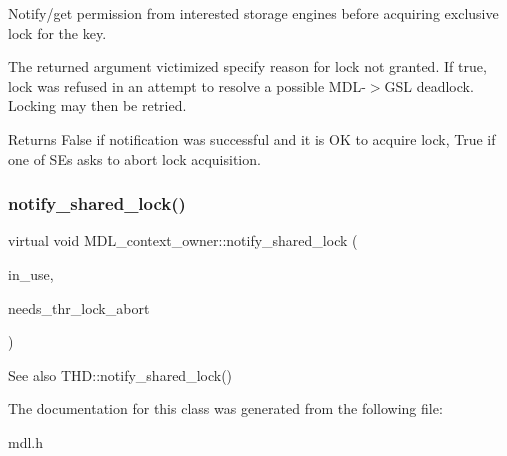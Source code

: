 Notify/get permission from interested storage engines before acquiring exclusive lock for the key.

The returned argument \textquotesingle{}victimized\textquotesingle{} specify reason for lock not granted. If \textquotesingle{}true\textquotesingle{}, lock was refused in an attempt to resolve a possible M\+DL-\/$>$G\+SL deadlock. Locking may then be retried.

\begin{DoxyReturn}{Returns}
False if notification was successful and it is OK to acquire lock, True if one of S\+Es asks to abort lock acquisition. 
\end{DoxyReturn}
\mbox{\label{classMDL__context__owner_a39cca8e5663058a27d0075811d238df4}} 
\subsubsection{\texorpdfstring{notify\+\_\+shared\+\_\+lock()}{notify\_shared\_lock()}}
{\footnotesize\ttfamily virtual void M\+D\+L\+\_\+context\+\_\+owner\+::notify\+\_\+shared\+\_\+lock (\begin{DoxyParamCaption}\item[{\mbox{\hyperlink{classMDL__context__owner}{M\+D\+L\+\_\+context\+\_\+owner}} $\ast$}]{in\+\_\+use,  }\item[{bool}]{needs\+\_\+thr\+\_\+lock\+\_\+abort }\end{DoxyParamCaption})\hspace{0.3cm}{\ttfamily [pure virtual]}}

\begin{DoxySeeAlso}{See also}
T\+H\+D\+::notify\+\_\+shared\+\_\+lock() 
\end{DoxySeeAlso}


The documentation for this class was generated from the following file\+:\begin{DoxyCompactItemize}
\item 
mdl.\+h\end{DoxyCompactItemize}
